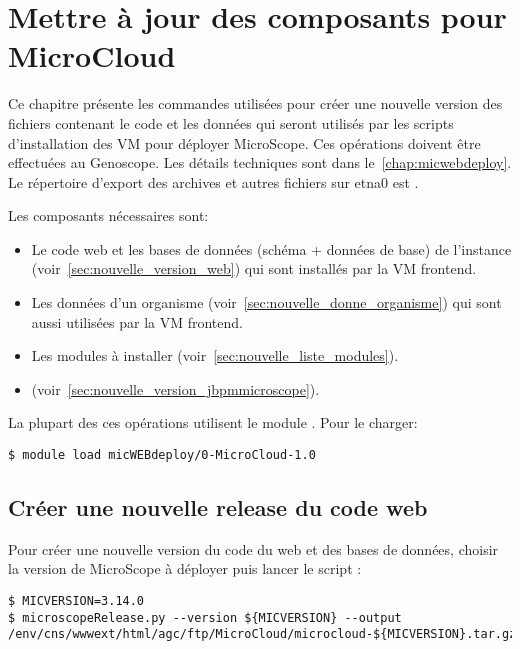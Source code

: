 \chapter{Mettre à jour des composants pour MicroCloud} \label{chap:creer_nouvelle_version}

Ce chapitre présente les commandes utilisées pour créer une nouvelle version
des fichiers contenant le code et les données qui seront utilisés
par les scripts d'installation des VM pour déployer MicroScope.
Ces opérations doivent être effectuées au Genoscope.
Les détails techniques sont dans le~\autoref{chap:micwebdeploy}.
Le répertoire d'export des archives et autres fichiers sur etna0 est .
\bigskip

Les composants nécessaires sont:
\begin{itemize}
    \item Le code web et les bases de données (schéma + données de base) de l'instance (voir~\autoref{sec:nouvelle_version_web})
          qui sont installés par la VM frontend.
    \item Les données d'un organisme (voir~\autoref{sec:nouvelle_donne_organisme})
          qui sont aussi utilisées par la VM frontend.
    \item Les modules à installer (voir~\autoref{sec:nouvelle_liste_modules}).
    \item {} (voir~\autoref{sec:nouvelle_version_jbpmmicroscope}).
\end{itemize}

La plupart des ces opérations utilisent le module \micWEBdeployVer.
Pour le charger:
\begin{lstlisting}[style=bash]
$ module load micWEBdeploy/0-MicroCloud-1.0
\end{lstlisting}

\section{Créer une nouvelle release du code web} \label{sec:nouvelle_version_web}

Pour créer une nouvelle version du code du web et des bases de données, choisir la version de MicroScope à déployer puis lancer le script  :
\begin{lstlisting}[style=bash]
$ MICVERSION=3.14.0
$ microscopeRelease.py --version ${MICVERSION} --output /env/cns/wwwext/html/agc/ftp/MicroCloud/microcloud-${MICVERSION}.tar.gz
\end{lstlisting}

